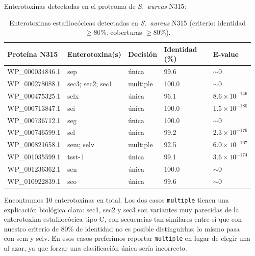 \medskip
Enterotoxinas detectadas en el proteoma de \textit{S.\ aureus} N315:

\begin{table}[H]
\centering
\footnotesize
\begin{tabular}{llP{1.5cm}P{1.8cm}P{2.2cm}}
\toprule
Proteína N315   & Enterotoxina(s)  & Decisión & Identidad (\%) & E-value \\
\midrule
WP\_000034846.1 & sep              & única    & 99.6  & $\sim 0$ \\
WP\_000278088.1 & sec3; sec2; sec1 & multiple & 100.0 & $\sim 0$ \\
WP\_000475325.1 & selx             & única    & 96.1  & $8.6 \times 10^{-146}$ \\
WP\_000713847.1 & sei              & única    & 100.0 & $1.5 \times 10^{-180}$ \\
WP\_000736712.1 & seg              & única    & 100.0 & $\sim 0$ \\
WP\_000746599.1 & sel              & única    & 99.2  & $2.3 \times 10^{-176}$ \\
WP\_000821658.1 & sem; selv        & multiple & 92.5  & $6.0 \times 10^{-167}$ \\
WP\_001035599.1 & tsst-1           & única    & 99.1  & $3.6 \times 10^{-174}$ \\
WP\_001236362.1 & sen              & única    & 100.0 & $\sim 0$ \\
WP\_010922839.1 & seo              & única    & 99.6  & $\sim 0$ \\
\bottomrule
\end{tabular}
\caption{Enterotoxinas estafilocócicas detectadas en \textit{S.\ aureus} N315
(criterio: identidad $\geq 80\%$, coberturas $\geq 80\%$).}
\end{table}

Encontramos 10 enterotoxinas en total. Los dos casos \texttt{multiple} tienen una explicación biológica
clara: sec1, sec2 y sec3 son variantes muy parecidas de la enterotoxina estafilocócica tipo C, con
secuencias tan similares entre sí que con nuestro criterio de 80\% de identidad no es posible
distinguirlas; lo mismo pasa con sem y selv. En esos casos preferimos reportar \texttt{multiple} en lugar
de elegir una al azar, ya que forzar una clasificación única sería incorrecto.
